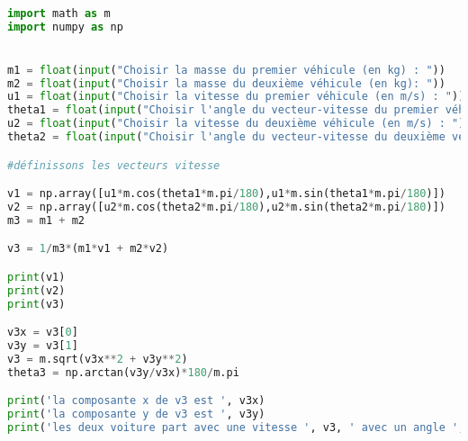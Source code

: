 \documentclass[11pt,a4paper]{article}
\begin{document}
\begin{lstlisting}[language=python]

import math as m
import numpy as np


m1 = float(input("Choisir la masse du premier véhicule (en kg) : "))
m2 = float(input("Choisir la masse du deuxième véhicule (en kg): "))
u1 = float(input("Choisir la vitesse du premier véhicule (en m/s) : "))
theta1 = float(input("Choisir l'angle du vecteur-vitesse du premier véhicule p/r à l'horizontal' (en degré) : "))
u2 = float(input("Choisir la vitesse du deuxième véhicule (en m/s) : "))
theta2 = float(input("Choisir l'angle du vecteur-vitesse du deuxième véhicule p/r à l'horizontal' (en degré) : "))

#définissons les vecteurs vitesse

v1 = np.array([u1*m.cos(theta1*m.pi/180),u1*m.sin(theta1*m.pi/180)])
v2 = np.array([u2*m.cos(theta2*m.pi/180),u2*m.sin(theta2*m.pi/180)])
m3 = m1 + m2

v3 = 1/m3*(m1*v1 + m2*v2)

print(v1)
print(v2)
print(v3)

v3x = v3[0]
v3y = v3[1]
v3 = m.sqrt(v3x**2 + v3y**2)
theta3 = np.arctan(v3y/v3x)*180/m.pi

print('la composante x de v3 est ', v3x)
print('la composante y de v3 est ', v3y)
print('les deux voiture part avec une vitesse ', v3, ' avec un angle ',theta3, ' degré par rapport à horizontal')
\end{lstlisting}
\end{document}
